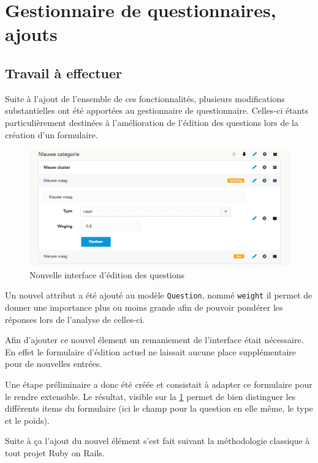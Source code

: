 \documentclass[12pt,a4paper]{book}
\begin{document}
\section{Gestionnaire de questionnaires, ajouts}

\label{section.gestionnaire_questionnaires_2}

\subsection{Travail à effectuer}

Suite à l'ajout de l'ensemble de ces fonctionnalités, plusieurs modifications substantielles ont été apportées au gestionnaire de questionnaire. Celles-ci étants particulièrement destinées à l'amélioration de l'édition des questions lors de la création d'un formulaire.

\begin{figure}[htp]
\centering
\includegraphics[scale=.45]{img/editor.png}
 \caption{Nouvelle interface d'édition des questions}
 \label{fig.editor}
\end{figure}

Un nouvel attribut a été ajouté au modèle \texttt{Question}, nommé \texttt{weight} il permet de donner une importance plus ou moins grande afin de pouvoir pondérer les réponses lors de l'analyse de celles-ci.

Afin d'ajouter ce nouvel élement un remaniement de l'interface était nécessaire. En effet le formulaire d'édition actuel ne laissait aucune place supplémentaire pour de nouvelles entrées.

Une étape préliminaire a donc été créée et consistait à adapter ce formulaire pour le rendre extensible. Le résultat, visible sur la \cref{fig.editor} permet de bien distinguer les différents items du formulaire (ici le champ pour la question en elle même, le type et le poids).

Suite à ça l'ajout du nouvel élément s'est fait suivant la méthodologie classique à tout projet Ruby on Rails.
\end{document}
